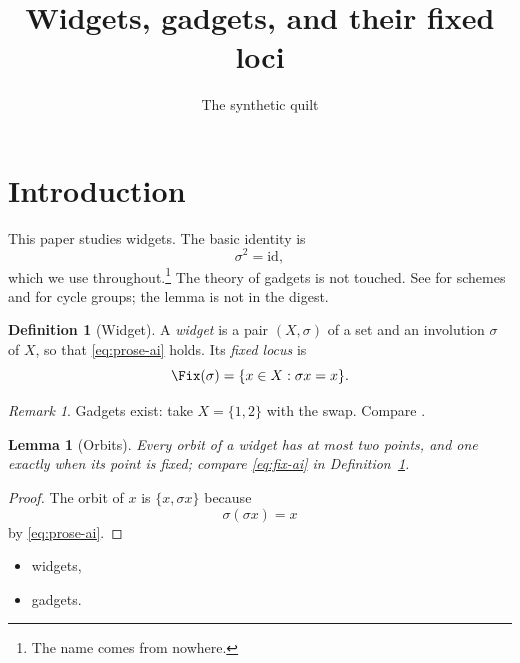 \documentclass{amsart}
\title{Widgets, gadgets, and their fixed loci}
\author{The synthetic quilt}
\theoremstyle{plain}
\newtheorem{lemma}[theorem]{Lemma}
\theoremstyle{definition}
\newtheorem{definition}[theorem]{Definition}
\theoremstyle{remark}
\newtheorem{remark}[theorem]{Remark}
\begin{document}
\maketitle

\section{Introduction}\label{sy-0100-ai}

This paper studies widgets. The basic identity is
\begin{equation}\label{eq:prose-ai}
\sigma^2 = \mathrm{id},
\end{equation}
which we use throughout.\footnote{The name comes from nowhere.} The \GW{} theory of gadgets is not touched. See \cite[Chapter II]{Har77} for schemes and \cite[Theorem 2.1]{Kre99} for cycle groups; the lemma \cite[Lemma 9]{Kre99} is not in the digest.

\begin{definition}[Widget]\label{sy-0001-ai}
A \emph{widget} is a pair $(X,\sigma)$ of a set and an involution $\sigma$ of $X$, so that \eqref{eq:prose-ai} holds. Its \emph{fixed locus} is
\begin{equation}\label{eq:fix-ai}
\Fix(\sigma) = \{x \in X : \sigma x = x\}.
\end{equation}
\end{definition}


\begin{remark}\label{sy-000A-ai}
Gadgets exist: take $X = \{1,2\}$ with the swap. Compare \cite[Theorem 2.1]{Kre99}.
\end{remark}

\begin{lemma}[Orbits]\label{sy-0002-ai}
Every orbit of a widget has at most two points, and one exactly when its point is fixed; compare \eqref{eq:fix-ai} in Definition~\ref{sy-0001-ai}.
\end{lemma}
\begin{proof}
The orbit of $x$ is $\{x, \sigma x\}$ because
\begin{equation}\label{eq:step-ai}
\sigma(\sigma x) = x
\end{equation}
by \eqref{eq:prose-ai}.
\end{proof}


\begin{itemize}
\item widgets,
\item gadgets.
\end{itemize}
\end{document}
